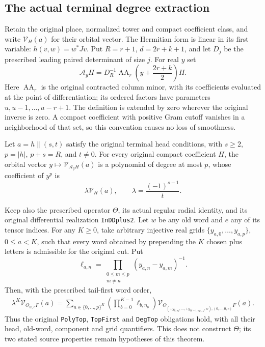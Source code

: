 \subsection{The actual terminal degree extraction}
\label{actual-terminal-degree}

Retain the original place, normalized tower and compact coefficient
class, and write $\mathcal V_H(a)$ for their orbital vector.  The
Hermitian form is linear in its first variable:
$h(v,w)=w^*Jv$.  Put $R=r+1$, $d=2r+k+1$, and let $D_j$ be the
prescribed leading paired determinant of size $j$.  For real $y$ set
\[
 \mathcal A_yH=D_R^{-1}\operatorname{AA}_r
                 \left(y+\frac{2r+k}{2}\right)H.
\]
Here $\operatorname{AA}_r$ is the original contracted column minor,
with its coefficients evaluated at the point of differentiation;
its ordered factors have parameters $u,u-1,\ldots,u-r+1$.
The definition is extended by zero wherever the original inverse is
zero.  A compact coefficient with positive Gram cutoff vanishes in
a neighborhood of that set, so this convention causes no loss of
smoothness.

\begin{theorem}\label{terminal-degree-actual}
Let $a=h\mathbin{\|}(s,t)$ satisfy the original terminal head conditions,
with $s\ge2$, $p=|h|$, $p+s=R$, and $t\ne0$.  For every original
compact coefficient $H$, the orbital vector
$y\mapsto\mathcal V_{\mathcal A_yH}(a)$ is a polynomial of degree
at most $p$, whose coefficient of $y^p$ is
\begin{equation}\label{terminal-degree-leading}
             \lambda\mathcal V_H(a),
             \qquad \lambda=\frac{(-1)^{s-1}}{t}.
\end{equation}

Keep also the prescribed operator $\Theta$, its actual regular
radial identity, and its original differential realization
\texttt{InDDplus2}.  Let $w$ be any old word and $e$ any of its
tensor indices.  For any $K\ge0$, take arbitrary injective real
grids $\{y_{a,0},\ldots,y_{a,p}\}$, $0\le a<K$, such that every
word obtained by prepending the $K$ chosen plus letters is admissible
for the original cut.  Put
\[
       \ell_{a,n}=\prod_{\substack{0\le m\le p\\m\ne n}}
                             (y_{a,n}-y_{a,m})^{-1}.
\]
Then, with the prescribed tail-first word order,
\begin{align}\label{terminal-degree-grid}
 \lambda^K\mathcal V_{\Theta_{w,e}F}(a)
 =\sum_{n\in\{0,\ldots,p\}^K}
       \left(\prod_{b=0}^{K-1}\ell_{b,n_b}\right)
       \mathcal V_{\Theta_{(+y_{0,n_0},\ldots,+y_{K-1,n_{K-1}},w),
                                      (0,\ldots,0,e)}F}(a).
\end{align}
Thus the original \texttt{PolyTop}, \texttt{TopFirst} and
\texttt{DegTop} obligations hold, with all their head, old-word,
component and grid quantifiers.  This does not construct $\Theta$;
its two stated source properties remain hypotheses of this theorem.
\end{theorem}

